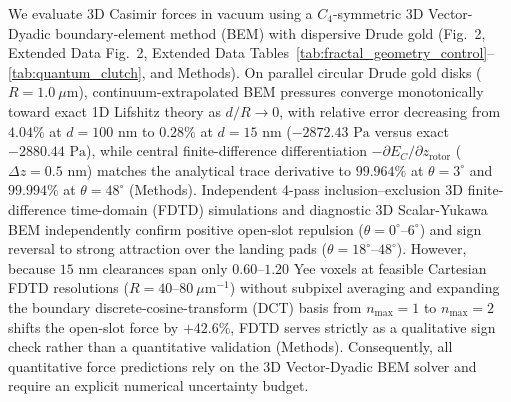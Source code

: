 \documentclass[11pt, a4paper]{article}
\begin{document}
We evaluate 3D Casimir forces in vacuum using a $C_4$-symmetric 3D Vector-Dyadic boundary-element method (BEM) with dispersive Drude gold\cite{reid2013pra,rakic1998} (Fig.~2, Extended Data Fig.~2, Extended Data Tables~\ref{tab:fractal_geometry_control}--\ref{tab:quantum_clutch}, and Methods). On parallel circular Drude gold disks ($R = 1.0\ \mu\text{m}$), continuum-extrapolated BEM pressures converge monotonically toward exact 1D Lifshitz theory as $d/R \to 0$, with relative error decreasing from $4.04\%$ at $d=100\text{ nm}$ to $0.28\%$ at $d=15\text{ nm}$ ($-2872.43\text{ Pa}$ versus exact $-2880.44\text{ Pa}$), while central finite-difference differentiation $-\partial E_C/\partial z_{\mathrm{rotor}}$ ($\Delta z = 0.5\text{ nm}$) matches the analytical trace derivative to $99.964\%$ at $\theta=3^\circ$ and $99.994\%$ at $\theta=48^\circ$ (Methods). Independent 4-pass inclusion--exclusion 3D finite-difference time-domain (FDTD) simulations\cite{rodriguez2009pra,oskooi2010} and diagnostic 3D Scalar-Yukawa BEM independently confirm positive open-slot repulsion ($\theta=0^\circ\text{--}6^\circ$) and sign reversal to strong attraction over the landing pads ($\theta=18^\circ\text{--}48^\circ$). However, because $15\text{ nm}$ clearances span only $0.60\text{--}1.20$ Yee voxels at feasible Cartesian FDTD resolutions ($R=40\text{--}80\ \mu\text{m}^{-1}$) without subpixel averaging and expanding the boundary discrete-cosine-transform (DCT) basis from $n_{\max}=1$ to $n_{\max}=2$ shifts the open-slot force by $+42.6\%$, FDTD serves strictly as a qualitative sign check rather than a quantitative validation (Methods). Consequently, all quantitative force predictions rely on the 3D Vector-Dyadic BEM solver and require an explicit numerical uncertainty budget.
\end{document}
